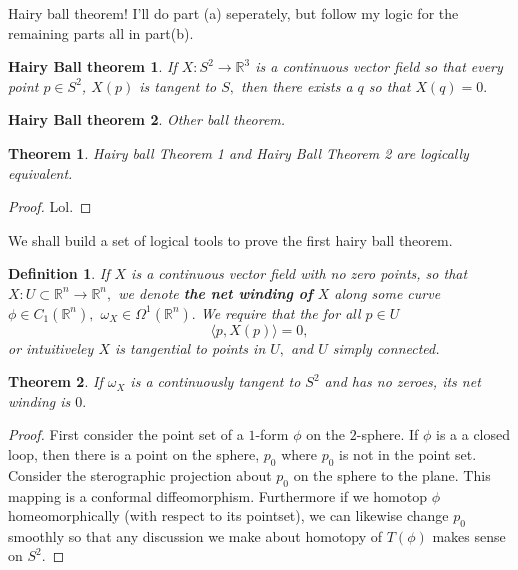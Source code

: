 \documentclass[letter]{article}
\newtheorem{theorem}{Theorem}
\newtheorem{hairy}{Hairy Ball theorem}
\newtheorem{definition}{Definition}
\newenvironment{menumerate}{%
  \edef\backupindent{\the\parindent}%
  \enumerate%
  \setlength{\parindent}{\backupindent}%
}{\endenumerate}
\begin{document}
\begin{menumerate}
	\setcounter{enumi}{70}
	\item Hairy ball theorem! I'll do part (a) seperately, but follow my logic for the remaining parts all in part(b).
	\begin{menumerate}
		\item 
		\begin{hairy}
 			If $X: S^2 \to \mathbb{R}^3$ is a continuous vector field so that every point $p\in S^2$, $X(p)$
 			is tangent to $S,$ then there exists a $q$ so that $X(q) = 0.$
 		\end{hairy}
 		\begin{hairy}
 			Other ball theorem.		
 		\end{hairy}
 		\begin{theorem}
 			Hairy ball Theorem 1 and Hairy Ball Theorem 2 are logically equivalent.
 		\end{theorem}
 		\begin{proof}
 			Lol.
 		\end{proof}
		\item We shall build a set of logical tools to prove the first hairy ball theorem.
		\begin{definition}
			If $X$ is a continuous vector field with no zero points, so that $X: U \subset \mathbb{R}^n \to \mathbb{R}^n,$
			we denote \textbf{the net winding of} $X$ along some curve $\phi \in C_1(\mathbb{R}^n),$
			$\omega_X \in \Omega^1(\mathbb{R}^n).$ We require that the for all  $p \in U$
			\begin{equation}
				\langle p , X(p) \rangle = 0,
			 \end{equation} or intuitiveley $X$ is tangential to points in $U,$ and $U$ \emph{simply connected.} 
		\end{definition}
		\begin{theorem}
			If $\omega_X$ is a continuously tangent to $S^2$ and has no zeroes, its net winding is $0.$
		\end{theorem}
		\begin{proof}
			First consider the point set of a $1$-form $\phi$ on the $2$-sphere. If $\phi$ is a a closed loop,
			then there is a point on the sphere, $p_0$ where $p_0$ is not in the point set. Consider the sterographic projection about 
			$p_0$ on the sphere to the plane. This mapping is a conformal diffeomorphism. Furthermore if we homotop $\phi$ homeomorphically
			(with respect to its pointset), we can likewise change $p_0$ smoothly so that any discussion we make about homotopy
			of $T(\phi)$ makes sense on $S^2.$


\end{proof}
\end{menumerate}
\end{menumerate}
\end{document}
